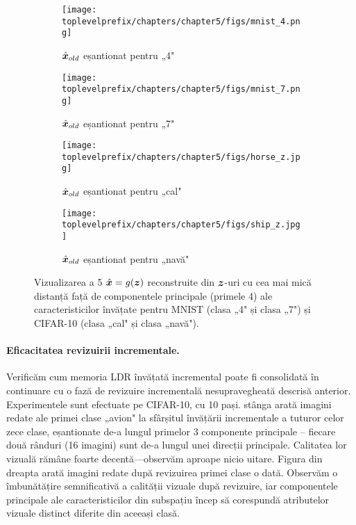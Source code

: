 \documentclass[../../book-main_ro.tex]{subfiles}
\begin{document}
\begin{figure}[t]
    \begin{subfigure}[t]{0.20\textwidth}
        \centering
        \texttt{[image: \\toplevelprefix/chapters/chapter5/figs/mnist\_4.png]}
        \caption{$\hat{\bm{x}}_{old}$ eșantionat pentru „4"}
    \end{subfigure}
    \hfill
    \begin{subfigure}[t]{0.20\textwidth}
        \centering
        \texttt{[image: \\toplevelprefix/chapters/chapter5/figs/mnist\_7.png]}
        \caption{$\hat{\bm{x}}_{old}$ eșantionat pentru „7"}
    \end{subfigure}
    \hfill
    \begin{subfigure}[t]{0.20\textwidth}
        \centering
        \texttt{[image: \\toplevelprefix/chapters/chapter5/figs/horse\_z.jpg]}
        \caption{$\hat{\bm{x}}_{old}$ eșantionat pentru „cal"}
    \end{subfigure}
    \hfill
    \begin{subfigure}[t]{0.20\textwidth}
        \centering
        \texttt{[image: \\toplevelprefix/chapters/chapter5/figs/ship\_z.jpg]}
        \caption{$\hat{\bm{x}}_{old}$ eșantionat pentru „navă"}
    \end{subfigure}
    \caption{\small Vizualizarea a 5 $\hat {\bm{x}}=g(\bm{z})$ reconstruite din $\bm{z}$-uri cu cea mai mică distanță față de componentele principale (primele 4) ale caracteristicilor învățate pentru {MNIST} (clasa „4" și clasa „7") și {CIFAR-10} (clasa „cal" și clasa „navă").}
    \label{fig:pca_sampling_main}
\end{figure}



\paragraph{Eficacitatea revizuirii incrementale.}
Verificăm cum memoria LDR învățată incremental poate fi consolidată în continuare cu o fază de revizuire incrementală nesupravegheată descrisă anterior. Experimentele sunt efectuate pe CIFAR-10, cu 10 pași.  stânga arată imagini redate ale primei clase „avion" la sfârșitul învățării incrementale a tuturor celor zece clase, eșantionate de-a lungul primelor 3 componente principale -- fiecare două rânduri (16 imagini) sunt de-a lungul unei direcții principale. Calitatea lor vizuală rămâne foarte decentă—observăm aproape nicio uitare. Figura din dreapta arată imagini redate după revizuirea primei clase o dată. Observăm o îmbunătățire semnificativă a calității vizuale după revizuire, iar componentele principale ale caracteristicilor din subspațiu încep să corespundă atributelor vizuale distinct diferite din aceeași clasă.
\end{document}
